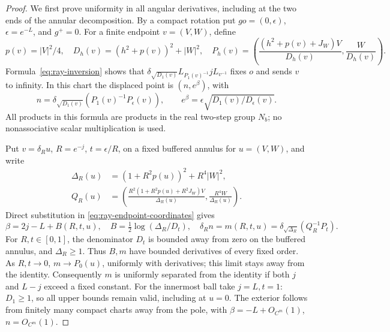 \begin{proof}
We first prove uniformity in all angular derivatives, including
at the two ends of the annular decomposition.  By a compact rotation
put \(go=(0,\epsilon)\), \(\epsilon=e^{-L}\), and \(g^+=0\).
For a finite endpoint \(v=(V,W)\), define
\[
 p(v)=|V|^2/4,\quad D_h(v)=(h^2+p(v))^2+|W|^2,\quad
 P_h(v)=\left(\frac{(h^2+p(v)+J_W)V}{D_h(v)},
                         \frac W{D_h(v)}\right).
\]
Formula~\eqref{eq:ray-inversion} shows that
\(\delta_{\sqrt{D_1(v)}}L_{P_1(v)^{-1}}jL_{v^{-1}}\) fixes \(o\)
and sends \(v\) to infinity.  In this chart the displaced point is
\((n,e^\beta)\), with
\begin{equation}\label{eq:ray-endpoint-coordinates}
 n=\delta_{\sqrt{D_1(v)}}(P_1(v)^{-1}P_\epsilon(v)),
 \qquad e^\beta=\epsilon\sqrt{D_1(v)/D_\epsilon(v)}.
\end{equation}
All products in this formula are products in the real two-step
group \(N_b\); no nonassociative scalar multiplication is used.

Put \(v=\delta_Ru\), \(R=e^{-j}\), \(t=\epsilon/R\), on a fixed
buffered annulus for \(u=(V,W)\), and write
\[
 \begin{split}
 \Delta_R(u)&=(1+R^2p(u))^2+R^4|W|^2,\\
 Q_R(u)&=\left(
 \frac{R^2(1+R^2p(u)+R^2J_W)V}{\Delta_R(u)},
 \frac{R^4W}{\Delta_R(u)}\right).
 \end{split}
\]
Direct substitution in \eqref{eq:ray-endpoint-coordinates}
gives
\begin{equation}\label{eq:ray-endpoint-scaled}
 \beta=2j-L+B(R,t,u),\quad
 B=\tfrac12\log(\Delta_R/D_t),\quad
 \delta_Rn=m(R,t,u)
   =\delta_{\sqrt{\Delta_R}}(Q_R^{-1}P_t).
\end{equation}
For \(R,t\in[0,1]\), the denominator \(D_t\) is bounded away from
zero on the buffered annulus, and \(\Delta_R\ge1\).  Thus \(B,m\)
have bounded derivatives of every fixed order.  As \(R,t\to0\),
\(m\to P_0(u)\), uniformly with derivatives; this limit stays away
from the identity.  Consequently \(m\) is uniformly separated
from the identity if both \(j\) and \(L-j\) exceed a fixed constant.
For the innermost ball take \(j=L,t=1\): \(D_1\ge1\), so all upper
bounds remain valid, including at \(u=0\).  The exterior follows
from finitely many compact charts away from the pole, with
\(\beta=-L+O_{C^m}(1)\), \(n=O_{C^m}(1)\).


\end{proof}
